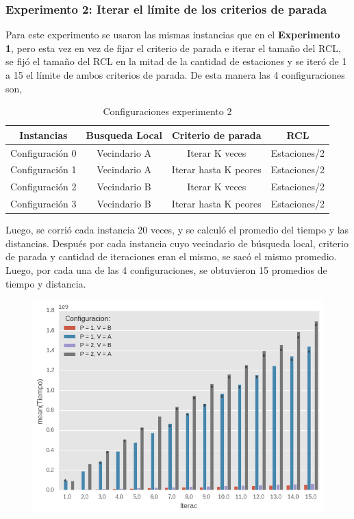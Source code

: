 \subsubsection{Experimento 2: Iterar el límite de los criterios de parada}

Para este experimento se usaron las mismas instancias que en el \textbf{Experimento 1}, pero esta vez en vez de fijar el criterio de parada e iterar el tamaño del RCL, se fijó el tamaño del RCL en la mitad de la cantidad de estaciones y se iteró de 1 a 15 el límite de ambos criterios de parada. De esta manera las 4 configuraciones son,


\begin{table}[H]
\centering
\begin{tabular}{ |c|c|c|c| } 
 \hline
 Instancias&Busqueda Local&Criterio de parada&RCL\\ 
 \hline
 Configuración 0 & Vecindario A & Iterar K veces & Estaciones/2\\
 \hline
 Configuración 1 & Vecindario A & Iterar hasta K peores & Estaciones/2\\
 \hline
 Configuración 2 & Vecindario B & Iterar K veces  & Estaciones/2\\
 \hline
 Configuración 3 & Vecindario B & Iterar hasta K peores & Estaciones/2\\
 \hline
\end{tabular}
\caption{Configuraciones experimento 2}
\end{table}

Luego, se corrió cada instancia 20 veces, y se calculó el promedio del tiempo y las distancias. 
Después por cada instancia cuyo vecindario de búsqueda local, criterio de parada y cantidad de iteraciones eran el mismo, se sacó el mismo promedio. Luego, por cada una de las 4 configuraciones, se obtuvieron 15 promedios de tiempo y distancia.



\begin{figure}[H]
    \begin{center}
      \includegraphics[width=0.7\columnwidth]{imagenes/Ej4/ej4_exp2_Tiempo.png}
    \end{center}
\end{figure}

